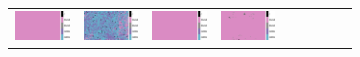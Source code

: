 \documentclass{ipol}
\begin{document}
\begin{figure}[ht]
\begin{subfigure}[t]{\linewidth}
\begin{tabular}{ccccccccc}
                \includegraphics[width=\s]{images/lake/DCB/bid_64_grids.png}&
                \includegraphics[width=\s]{images/lake/DHT/bid_64_grids.png}&
                \includegraphics[width=\s]{images/lake/LINEAR/bid_64_grids.png}&
                \includegraphics[width=\s]{images/lake/PPG/bid_64_grids.png}&

\end{tabular}
\end{subfigure}
\end{figure}
\end{document}
